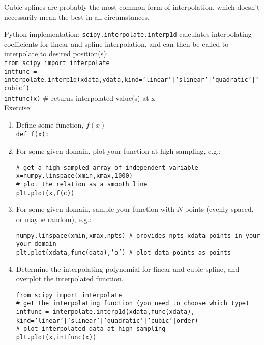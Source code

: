 \documentclass[12pt]{article}
\begin{document}
Cubic splines are probably the most common form of interpolation, which doesn't
necessarily mean the best in all circumstances.

Python implementation: \texttt{scipy.interpolate.interp1d} calculates
interpolating coefficients for linear and spline interpolation, and can then
be called to interpolate to desired position(s): \\

\noindent\texttt{from scipy import interpolate \\
intfunc = interpolate.interp1d(xdata,ydata,kind=`linear'|`slinear'|`quadratic'|`cubic') \\
intfunc(x)} $\#$ returns interpolated value(s) at x  \\

Exercise:
\begin{enumerate}
    \item Define some function, $f(x)$\\
        \texttt{def f(x):}\\
            $\ldots$
    \item For some given domain, plot your function at high sampling, e.g.:

        \texttt{\# get a high sampled array of independent variable\\
        x=numpy.linspace(xmin,xmax,1000)\\
        \# plot the relation as a smooth line\\
        plt.plot(x,f(c))}
    \item For some given domain, sample your function with $N$ points
        (evenly spaced, or maybe random), e.g.:

        \texttt{numpy.linspace(xmin,xmax,npts) \# provides npts xdata
        points in your your domain\\
        plt.plot(xdata,func(data),'o') \# plot data points as points}
    \item Determine the interpolating polynomial for linear and cubic
        spline, and overplot the interpolated function.

        \texttt{from scipy import interpolate\\
        \# get the interpolating function (you need to choose which type)\\
        intfunc = interpolate.interp1d(xdata,func(xdata),
        kind='linear'|'slinear'|'quadratic'|'cubic'|order)\\
        \# plot interpolated data at high sampling\\
        plt.plot(x,intfunc(x))}
\end{enumerate}
\end{document}
